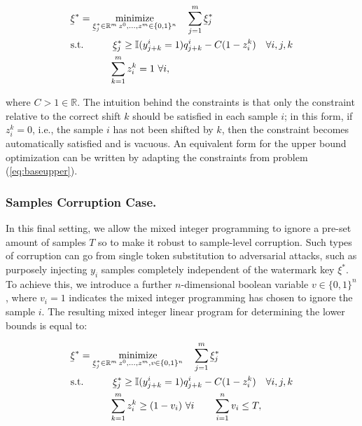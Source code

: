 \begin{align}
    & \ubar{\xi}^* = \underset{\ubar{\xi}^*_j \in \mathbb{R}^m \, z^0, \dots, z^{m} \in \{0, 1\}^n}{\text{minimize}} \quad  \sum_{j=1}^m \ubar{\xi}^*_j \label{eq:shiftlower}\\
    &\text{s.t.} \quad \quad \quad \ubar{\xi}^*_j \geq  \mathbb{I}(y_{j+k}^i = 1) q_{j + k}^{i} - C (1 - z_i^k)\quad \forall i, j, k \notag \\
    & \quad \quad \quad \quad \sum_{k=1}^m z_i^k = 1 \, \, \forall i, \notag
\end{align}

where $C > 1 \in \mathbb{R}$. The intuition behind the constraints is that only the constraint relative to the correct shift $k$ should be satisfied in each sample $i$; in this form, if $z_i^k =0$, i.e., the sample $i$ has not been shifted by $k$, then the constraint becomes automatically satisfied and is vacuous. An equivalent form for the upper bound optimization can be written by adapting the constraints from problem (\ref{eq:baseupper}).


\subsubsection{Samples Corruption Case.} In this final setting, we allow the mixed integer programming to ignore a pre-set amount of samples $T$ so to make it robust to sample-level corruption. Such types of corruption can go from single token substitution to adversarial attacks, such as purposely injecting $y_i$ samples completely independent of the watermark key $\xi^*$. To achieve this, we introduce a further $n$-dimensional boolean variable $v \in \{0,1\}^n$, where $v_i = 1$ indicates the mixed integer programming has chosen to ignore the sample $i$. The resulting mixed integer linear program for determining the lower bounds is equal to:


\begin{align}
    & \ubar{\xi}^* = \underset{\ubar{\xi}^*_j \in \mathbb{R}^m \, z^0, \dots, z^{m}, v \in \{0, 1\}^n}{\text{minimize}} \quad  \sum_{j=1}^m \ubar{\xi}^*_j \label{eq:shiftcorrlower}\\
    &\text{s.t.} \quad \quad \quad \ubar{\xi}^*_j \geq  \mathbb{I}(y_{j+k}^i = 1) q_{j + k}^{i} - C (1 - z_i^k)\quad \forall i, j, k \notag \\
    & \quad \quad \quad \quad \sum_{k=1}^m z_i^k \geq (1-v_i) \, \, \forall i \quad \quad \sum_{i=1}^n v_i \leq T, \notag \notag 
\end{align}

